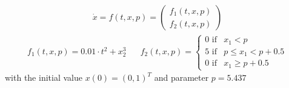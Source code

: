\begin{align*}
	\dot{x} = f(t,x,p) = 
	\begin{pmatrix} 
		f_1(t,x,p) \\
		f_2(t,x,p)
	\end{pmatrix}
\end{align*}
\begin{align*}
	f_1(t,x,p) = 0.01 \cdot t^2 + x_2^3 \hspace{20pt} f_2(t,x,p) = \begin{cases} 
		0 \text{  if} & x_1 < p \\ 5 \text{  if} & p \leq x_1 < p +0.5 \\ 0 \text{  if} & x_1 \geq p + 0.5 \end{cases}
\end{align*}
with the initial value ${ x(0) = (0,1)^T}$ and parameter ${p = 5.437}$

